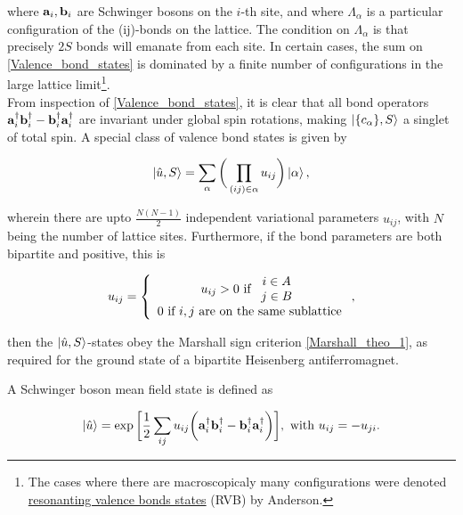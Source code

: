 \documentclass{homework}
\begin{document}
where ${\bf a}_i, {\bf b}_i$ are Schwinger bosons on the $i$-th site, and where $\Lambda_{\alpha}$ is a particular configuration of the (ij)-bonds on the lattice. The condition on $\Lambda_{\alpha}$ is that precisely $2S$ bonds will emanate from each site. In certain cases, the sum on 
\cref{Valence_bond_states} is dominated by a finite number of configurations in the large lattice limit\footnote{

The cases where there are macroscopicaly many configurations were denoted \underline{resonanting valence bonds states} (RVB) by Anderson.

}. \\

From inspection of \cref{Valence_bond_states}, it is clear that all bond operators ${\bf a}_i^\dagger {\bf b}_i^\dagger - {\bf b}_i^\dagger {\bf a}_i^\dagger$ are invariant under global spin rotations, making $\ket{\{c_{\alpha}\}, S}$ a singlet of total spin. A special class of valence bond states is given by 

\begin{equation}
    \ket{\hat{u}, S} = \sum_{\alpha} \bigg(\prod_{(ij) \in \alpha} u_{ij}\bigg) \ket{\alpha},
    \label{special_class_Valence_bond_states }
\end{equation}

wherein there are upto $\frac{N(N-1)}{2}$ independent variational parameters $u_{ij}$, with $N$ being the number of lattice sites. Furthermore, if the bond parameters are both bipartite and positive, this is 

\begin{equation}
    u_{ij} = \left\{\begin{array}{c}
       u_{ij} > 0  \textnormal{ if } \begin{array}{c}
            i \in A  \\
            j \in B
       \end{array}  \\
       0 \textnormal{ if $i,j$ are on the same sublattice}
    \end{array}\right.,
\end{equation}

then the $\ket{\hat{u}, S}$-states obey the Marshall sign criterion \cref{Marshall_theo_1}, as required for the ground state of a bipartite Heisenberg antiferromagnet. 

\clearpage 

A Schwinger boson mean field state is defined as 

\begin{equation}
    \ket{\hat{u}} = \exp \bigg[\frac{1}{2} \sum_{ij} u_{ij} \bigg({\bf a}_i^\dagger {\bf b}_i^\dagger - {\bf b}_i^\dagger {\bf a}_i^\dagger\bigg)\bigg], \textnormal{ with } u_{ij} = -u_{ji}.
    \label{Schwinger_mean_field_state}
\end{equation}
\end{document}
